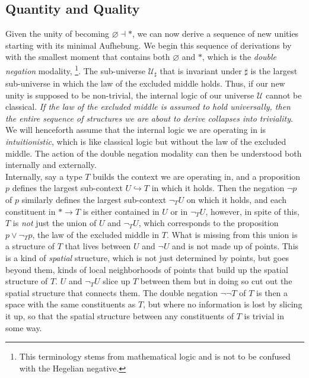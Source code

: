 \documentclass{article}
\begin{document}
\subsection{Quantity and Quality}
Given the unity of becoming $\varnothing\dashv *$, we can now derive a sequence of new unities starting with 
its minimal Aufhebung. We begin this sequence of derivations by with the smallest moment that contains both 
$\varnothing$ and $*$, which is the \emph{double negation} modality, \cite{Sketches}\footnote{This terminology
stems from mathematical logic and is not to be confused with the Hegelian negative.}. The sub-universe 
$\mathcal{U}_\sharp$ that is invariant under $\sharp$ is the largest sub-universe in which the law of the 
excluded middle holds. Thus, if our new unity is supposed to be non-trivial, the internal logic of our 
universe $\mathcal{U}$ cannot be classical. \emph{If the law of the excluded middle is assumed to hold 
universally, then the entire sequence of structures we are about to derive collapses into triviality}. We 
will henceforth assume that the internal logic we are operating in is \emph{intuitionistic}, which is like 
classical logic but without the law of the excluded middle. The action of the double negation modality can 
then be understood both internally and externally. \\

Internally, say a type $T$ builds the context we are operating in, and a proposition $p$ defines the largest 
sub-context $U\hookrightarrow T$ in which it holds. Then the negation $\neg p$ of $p$ similarly defines the 
largest sub-context $\neg_T U$ on which it holds, and each constituent in $*\rightarrow T$ is either 
contained in $U$ or in $\neg_T U$, however, in spite of this, $T$ is \emph{not} just the union of $U$ and 
$\neg_T U$, which corresponds to the proposition $p\vee \neg_T p$, the law of the excluded middle in $T$. 
What is missing from this union is a structure of $T$ that lives between $U$ and $\neg U$ and is not made up 
of points. This is a kind of \emph{spatial} structure, which is not just determined by points, but goes 
beyond them, kinds of local neighborhoods of points that build up the spatial structure of $T$. $U$ and 
$\neg_T U$ slice up $T$ between them but in doing so cut out the spatial structure that connects them. The 
double negation $\neg\neg T$ of $T$ is then a space with the same constituents as $T$, but where no 
information is lost by slicing it up, so that the spatial structure between any constituents of $T$ is 
trivial in some way. \\
\end{document}
